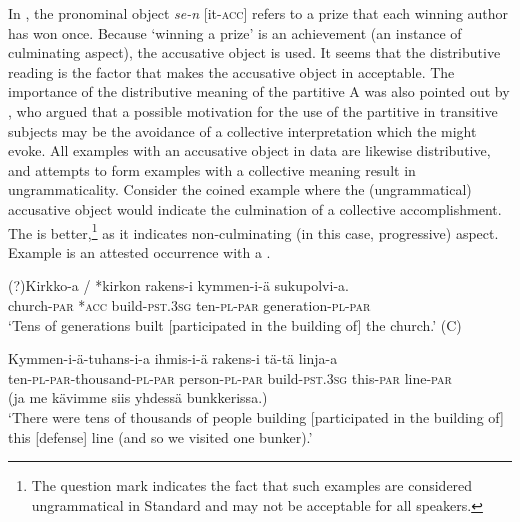 \documentclass[output=paper]{LSP/langsci}
\begin{document}
In , the pronominal object \textit{se-n} [it-\textsc{acc]} refers to a prize that each winning author has won once. Because ‘winning a prize’ is an achievement (\ie an instance of culminating aspect), the accusative object is used. It seems that the distributive reading is the factor that makes the accusative object in  acceptable. The importance of the distributive meaning of the partitive A was also pointed out by \citet[77]{Siro1964Suomen}, who argued that a possible motivation for the use of the partitive in transitive subjects may be the avoidance of a collective interpretation which the  might evoke. All examples with an accusative object in  data are likewise distributive, and attempts to form examples with a collective meaning result in ungrammaticality. Consider the coined example  where the (ungrammatical) accusative object would indicate the culmination of a collective accomplishment. The  is better,\footnote{The question mark indicates the fact that such examples are considered ungrammatical in Standard  and may not be acceptable for all speakers.} as it indicates non-culminating (in this case, progressive) aspect. Example  is an attested occurrence with a . 

\ea\label{15-hu-ex:24}
\gll (?)Kirkko-a / *kirkon rakens-i kymmen-i-ä sukupolvi-a.\\
church-\textsc{par} {} *\textsc{acc} build-\textsc{pst}.\textsc{3sg} ten-\textsc{pl}-\textsc{par} generation-\textsc{pl}-\textsc{par}\\
\glt ‘Tens of generations built [participated in the building of] the church.’ (C)
\z

\ea\label{15-hu-ex:25}
\gll Kymmen-i-ä-tuhans-i-a ihmis-i-ä rakens-i tä-tä linja-a\\
ten-\textsc{pl}-\textsc{par}-thousand-\textsc{pl}-\textsc{par} person-\textsc{pl}-\textsc{par} build-\textsc{pst}.\textsc{3sg} this-\textsc{par} line-\textsc{par}\\
(ja me kävimme siis yhdessä bunkkerissa.)\\
\glt `There were tens of thousands of people building [participated in the building of] this [defense] line (and so we visited one bunker).’ %
\z
\end{document}
